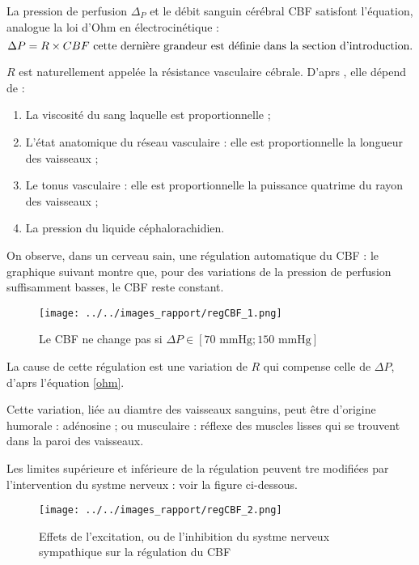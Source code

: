 \par
La pression de perfusion $\Delta_P$ et le d\'ebit sanguin c\'er\'ebral CBF satisfont l'\'equation, analogue  la loi d'Ohm en \'electrocin\'etique :
\begin{equation}
\Delta P = R\times CBF%
\text{ cette derni\g{e}re grandeur est d\'efinie dans la section d'introduction.}
\label{ohm}
\end{equation}

$R$ est naturellement appel\'ee la r\'esistance vasculaire c\'ebrale. D'aprs \cite{vib_dsc}, elle d\'epend de :
\begin{enumerate}
\item La viscosit\'e du sang  laquelle est proportionnelle ;
\item L'\'etat anatomique du r\'eseau vasculaire : elle est proportionnelle  la longueur des vaisseaux ;
\item\label{reac_r_cbf} Le tonus vasculaire : elle est proportionnelle  la puissance quatrime du rayon des vaisseaux ;
\item La pression du liquide c\'ephalorachidien.
\end{enumerate}

On observe, dans un cerveau sain, une r\'egulation automatique du CBF : %
le graphique suivant montre que, pour des variations de la pression de perfusion suffisamment basses, le CBF reste constant.

\begin{figure}
\texttt{[image: ../../images\_rapport/regCBF\_1.png]}
\caption{Le CBF ne change pas si $\Delta P\in \left[70\text{ mmHg};150\text{ mmHg}\right]$}
\label{regcbf_1}
\end{figure}

La cause de cette r\'egulation est une variation de $R$ qui compense celle de $\Delta P$, d'aprs l'\'equation \ref{ohm}.

\par
Cette variation, li\'ee au diamtre des vaisseaux sanguins, peut \^etre d'origine humorale : ad\'enosine \cite{vib_dsc} ; %
ou musculaire : r\'eflexe des muscles lisses qui se trouvent dans la paroi des vaisseaux.

\par
Les limites sup\'erieure et inf\'erieure de la r\'egulation peuvent tre modifi\'ees par l'intervention du systme nerveux : voir la figure ci-dessous.

\begin{figure}
\texttt{[image: ../../images\_rapport/regCBF\_2.png]}
\caption{Effets de l'excitation, ou de l'inhibition du systme nerveux sympathique sur la r\'egulation du CBF}
\label{regcbf_2}
\end{figure}

